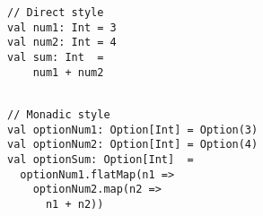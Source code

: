 \begin{algorithm}

\begin{minipage}{0.35\textwidth}
\begin{verbatim}
// Direct style
val num1: Int = 3
val num2: Int = 4
val sum: Int  =
    num1 + num2
    

\end{verbatim}
\end{minipage}
%
%
\begin{minipage}{0.45\textwidth}
\begin{verbatim}
// Monadic style
val optionNum1: Option[Int] = Option(3)
val optionNum2: Option[Int] = Option(4)
val optionSum: Option[Int]  =
  optionNum1.flatMap(n1 =>
    optionNum2.map(n2 =>
      n1 + n2))
\end{verbatim}
\end{minipage}
    
\caption{Direct vs. monadic syntax in Scala. %
\label{monad:syntax}}
\end{algorithm}
